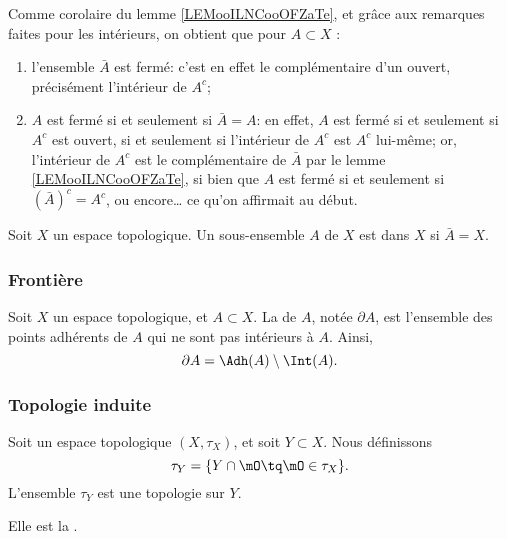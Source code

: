 \begin{remark}\label{RemAdhFerme}
    Comme corolaire du lemme \ref{LEMooILNCooOFZaTe}, et grâce aux remarques faites pour les intérieurs, on obtient que pour \( A \subset X \) :
	\begin{enumerate}
		\item l'ensemble \( \bar A \) est fermé: c'est en effet le complémentaire d'un ouvert, précisément l'intérieur de \( A^c \);
		\item \( A \) est fermé si et seulement si \( \bar A = A \): en effet, \( A \) est fermé si et seulement si \( A^c \) est ouvert, si et seulement si l'intérieur de \( A^c \) est \( A^c \) lui-même; or, l'intérieur de \( A^c \) est le complémentaire de \( \bar A \) par le lemme \ref{LEMooILNCooOFZaTe}, si bien que \( A \) est fermé si et seulement si \( (\bar A)^c  = A^c \), ou encore\dots{} ce qu'on affirmait au début.
	\end{enumerate}
\end{remark}

\begin{definition}\label{DefEnsembleDense}
	Soit \( X \) un espace topologique. Un sous-ensemble \( A \) de \( X \) est  dans \( X \) si \( \bar A = X\).
\end{definition}

\subsubsection{Frontière}

\begin{definition}
	Soit \( X \) un espace topologique, et \( A \subset X \). La  de \( A \), notée \( \partial A \), est l'ensemble des points adhérents de \( A \) qui ne sont pas intérieurs à \( A \). Ainsi,
	\begin{equation}
		\partial A = \Adh(A) \setminus \Int(A).
	\end{equation}
\end{definition}

\subsubsection{Topologie induite}

\begin{propositionDef} \label{DefVLrgWDB}
	Soit un espace topologique \( (X, \tau_X) \), et soit \( Y \subset X \). Nous définissons
	\begin{equation}
		\tau_Y=\{ Y\cap\mO\tq \mO\in\tau_X \}.
	\end{equation}
	L'ensemble \( \tau_Y\) est une topologie sur \( Y\).

	Elle est la .
\end{propositionDef}

